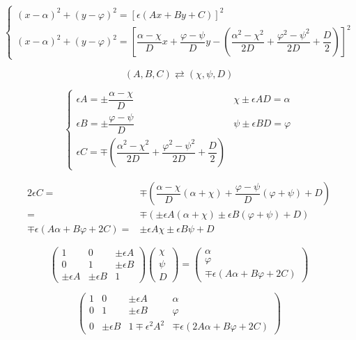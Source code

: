 \documentclass[
]{book}
\theoremstyle{definition}
\theoremstyle{definition}
\theoremstyle{definition}
\theoremstyle{definition}
\theoremstyle{remark}
\begin{document}
\[
\begin{cases}
\left(x-\alpha\right)^{2}+\left(y-\varphi\right)^{2}=\left[\epsilon\left(Ax+By+C\right)\right]^{2}\\
\left(x-\alpha\right)^{2}+\left(y-\varphi\right)^{2}=\left[\dfrac{\alpha-\chi}{D}x+\dfrac{\varphi-\psi}{D}y-\left(\dfrac{\alpha^{2}-\chi^{2}}{2D}+\dfrac{\varphi^{2}-\psi^{2}}{2D}+\dfrac{D}{2}\right)\right]^{2}
\end{cases}
\]

\[
\left(A,B,C\right)\rightleftarrows\left(\chi,\psi,D\right)
\]

\[
\begin{cases}
\epsilon A=\pm\dfrac{\alpha-\chi}{D} & \chi\pm\epsilon AD=\alpha\\
\epsilon B=\pm\dfrac{\varphi-\psi}{D} & \psi\pm\epsilon BD=\varphi\\
\epsilon C=\mp\left(\dfrac{\alpha^{2}-\chi^{2}}{2D}+\dfrac{\varphi^{2}-\psi^{2}}{2D}+\dfrac{D}{2}\right)
\end{cases}
\]

\[
\begin{aligned}
2\epsilon C= & \mp\left(\dfrac{\alpha-\chi}{D}\left(\alpha+\chi\right)+\dfrac{\varphi-\psi}{D}\left(\varphi+\psi\right)+D\right)\\
= & \mp\left(\pm\epsilon A\left(\alpha+\chi\right)\pm\epsilon B\left(\varphi+\psi\right)+D\right)\\
\mp\epsilon\left(A\alpha+B\varphi+2C\right)= & \pm\epsilon A\chi\pm\epsilon B\psi+D
\end{aligned}
\]

\[
\begin{pmatrix}1 & 0 & \pm\epsilon A\\
0 & 1 & \pm\epsilon B\\
\pm\epsilon A & \pm\epsilon B & 1
\end{pmatrix}\begin{pmatrix}\chi\\
\psi\\
D
\end{pmatrix}=\begin{pmatrix}\alpha\\
\varphi\\
\mp\epsilon\left(A\alpha+B\varphi+2C\right)
\end{pmatrix}
\]

\[
\begin{pmatrix}1 & 0 & \pm\epsilon A & \alpha\\
0 & 1 & \pm\epsilon B & \varphi\\
0 & \pm\epsilon B & 1\mp\epsilon^{2}A^{2} & \mp\epsilon\left(2A\alpha+B\varphi+2C\right)
\end{pmatrix}
\]
\end{document}
